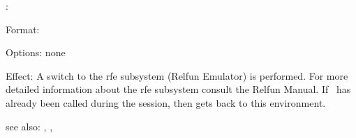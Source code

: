 \colab{} \rfe:

Format: 

Options: none

Effect: A switch to the rfe subsystem (Relfun Emulator) is 
        performed. For more detailed information about the rfe 
        subsystem consult the Relfun Manual. 
	If \rfe \ has already been called during the \COLAB{}
        session, then \COLAB{} gets back to this environment.
       
see also: \relfun, \rfi, \colab
